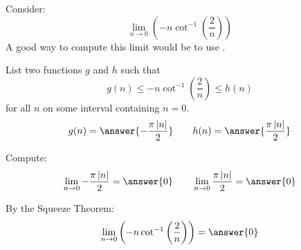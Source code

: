 \documentclass{ximera}
\author{Bart Snapp}
\begin{document}
\begin{exercise}


Consider:
\[
\lim_{n\to 0} \left(-n \cot ^{-1}\left(\frac{2}{n}\right)\right)
\]
A good way to compute this limit would be to use .
\begin{exercise}
List two functions $g$ and $h$ such that
\[
g(n)\le -n \cot ^{-1}\left(\frac{2}{n}\right) \le h(n)
\]
for all $n$ on some interval containing $n=0$.
\[
g(n)=\answer{-\frac{\pi  \left| n\right| }{2}}\qquad h(n) =\answer{\frac{\pi  \left| n\right| }{2}}
\]
\begin{exercise}
Compute:
\[
\lim_{n \to 0}-\frac{\pi  \left| n\right| }{2} = \answer{0}\qquad \lim_{n\to 0}\frac{\pi  \left| n\right| }{2} = \answer{0}
\]
\begin{exercise}
By the Squeeze Theorem:
\[
\lim_{n\to 0} \left(-n \cot ^{-1}\left(\frac{2}{n}\right)\right) = \answer{0}
\]
\end{exercise}
\end{exercise}
\end{exercise}
\end{exercise}
\end{document}
